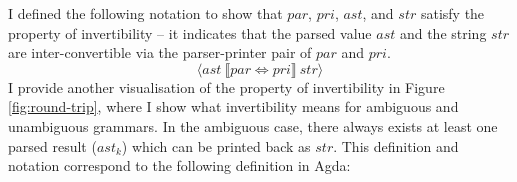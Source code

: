 \documentclass[12pt,a4paper,twoside,openright]{report}
\begin{document}
I defined the following notation to show that {$par$}, {$pri$}, {$ast$}, and {$str$} satisfy the property of invertibility -- it indicates that the parsed value {$ast$} and the string {$str$} are inter-convertible via the parser-printer pair of {$par$} and {$pri$}. 
$$\langle {ast}\ \llbracket {par}\! \iff\! {pri} \rrbracket\ {str} \rangle $$
I provide another visualisation of the property of invertibility in Figure \ref{fig:round-trip}, where I show what invertibility means for ambiguous and unambiguous grammars. In the ambiguous case, there always exists at least one parsed result ($ast_k$) which can be printed back as $str$.  
This definition and notation correspond to the following definition in Agda:

\begin{code}
\>  \AgdaSymbol{\{} \AgdaSymbol{:} \AgdaSymbol{\}} \AgdaSymbol{:}            \<%
\\
\>[0]\<[2]%
\>[2] \AgdaSymbol{:} \>[15]\AgdaSymbol{(} \AgdaSymbol{:} \AgdaSymbol{)}  \AgdaSymbol{(} \AgdaSymbol{:}  \AgdaSymbol{)}  \AgdaSymbol{(} \AgdaSymbol{:}  \AgdaSymbol{)}  \AgdaSymbol{(} \AgdaSymbol{:} \AgdaSymbol{)} \<%
\\
\>[2]\<[15]%
\>[15]            \<%
\\
\>[2]\<[15]%
\>[15]        \<%
\end{code}
\end{document}
